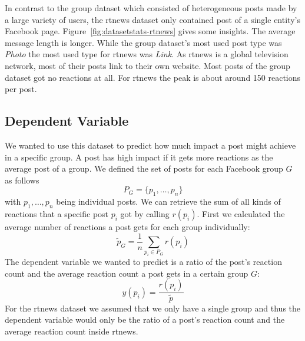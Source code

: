 In contrast to the group dataset which consisted of heterogeneous posts made by a large
variety of users, the rtnews dataset only contained post of a single entity's Facebook 
page. Figure~\ref{fig:datasetstats-rtnews} gives some insights. The average message length
is longer. While the group dataset's most used post type was \emph{Photo} the most used type
for rtnews was \emph{Link}. As rtnews is a global television network, most of their posts
link to their own website. Most posts of the group dataset got no reactions at 
all. For rtnews the peak is about around 150 reactions per post.

\subsection{Dependent Variable}
We wanted to use this dataset to predict how much impact a post might achieve in a
specific group. A post has high impact if it gets more reactions as the average post of a 
group. We defined the set of posts for each Facebook group $G$ as follows
\[
    P_G = \{p_1, \dots, p_n\}
\]
with $p_1, \dots, p_n$ being individual posts. We can retrieve the sum of all kinds of
reactions that a specific post $p_i$ got by calling $r(p_i)$. First we calculated the average
number of reactions a post gets for each group  individually:
\[
    \tilde{p}_G = \frac{1}{n} \sum_{p_i \in P_G} r(p_i)
\]
The dependent variable we wanted to predict is a ratio of the post's reaction count and
the  average reaction count a post gets in a certain group $G$:
\[
    y(p_i) = \frac{r(p_i)}{\tilde{p}}
\]
For the rtnews dataset we assumed that we only have a single group and thus the dependent 
variable would only be the ratio of a post's reaction count and the average reaction count
inside rtnews.
